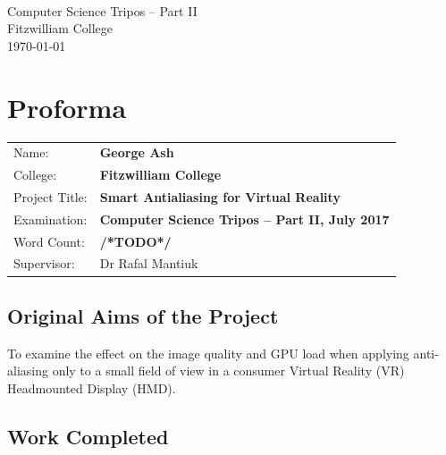 \documentclass[12pt,a4paper,twoside,openright]{report}
\begin{document}





\pagestyle{empty}


\vspace*{60mm}
\begin{center}
\Huge
\textbf{} \\[5mm]
Computer Science Tripos -- Part II \\[5mm]
Fitzwilliam College \\[5mm]
\today  %
\end{center}


\pagestyle{plain}

\chapter*{Proforma}

{\large
\begin{tabular}{ll}
Name:               & \bf George Ash                       \\
College:            & \bf Fitzwilliam College                     \\
Project Title:      & \bf Smart Antialiasing for Virtual Reality \\
Examination:        & \bf Computer Science Tripos -- Part II, July 2017  \\
Word Count:         & \bf /*TODO*/ \\
Supervisor:         & Dr Rafal Mantiuk                    \\ 
\end{tabular}
}

\section*{Original Aims of the Project}

To examine the effect on the image quality and GPU load when applying anti-aliasing only to a small field of view in a consumer Virtual Reality (VR) Headmounted Display (HMD).


\section*{Work Completed}
\end{document}
